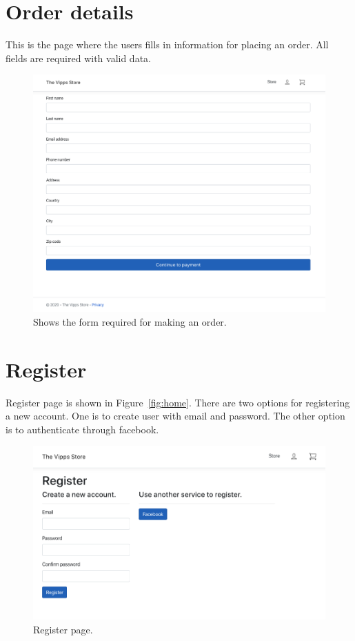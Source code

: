 \documentclass[11pt,a4paper,english]{article}
\begin{document}
\section*{Order details}
This is the page where the users fills in information for placing an order. All fields are required with valid data.
\begin{figure}[htbp]
  \centering
  \includegraphics[scale=0.2]{order}
  \caption{Shows the form required for making an order.}
  \label{fig:order}
\end{figure}
\section*{Register}
Register page is shown in Figure~\ref{fig:home}. There are two options for registering a new account. One is to create user with email and password. The other option is to authenticate through facebook.
\begin{figure}[htbp]
  \centering
  \includegraphics[scale=0.3]{register}
  \caption{Register page.}
  \label{fig:register}
\end{figure}
\end{document}
